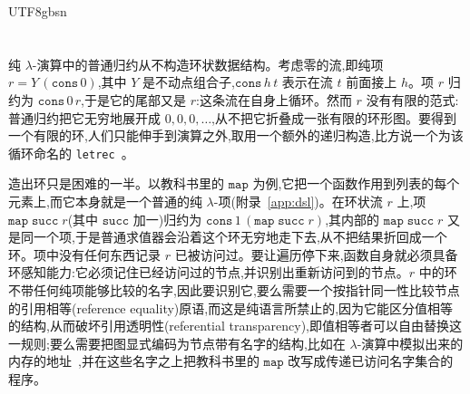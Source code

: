 \begin{CJK*}{UTF8}{gbsn}
  \keywords{\tablambdaKeywords{,}}
  \fi
  \fi %

  \ifTablambdaLNCS\else
  \maketitle
  \fi

  \ifTablambdaBody
  \section{}\label{sec:intro}

  \subsection{}

  \ifPaperChinese
  纯 $\lambda$-演算中的普通归约从不构造环状数据结构。考虑零的流,即纯项 $r = Y\,(\mathtt{cons}\,0)$,其中 $Y$ 是不动点组合子,$\mathtt{cons}\,h\,t$ 表示在流 $t$ 前面接上 $h$。项 $r$ 归约为 $\mathtt{cons}\,0\,r$,于是它的尾部又是 $r$:这条流在自身上循环。然而 $r$ 没有有限的范式:普通归约把它无穷地展开成 $0,0,0,\dots$,从不把它折叠成一张有限的环形图。要得到一个有限的环,人们只能伸手到演算之外,取用一个额外的递归构造,比方说一个为该循环命名的 \texttt{letrec}~\cite{ariola1997-explicit-recursion}。

  造出环只是困难的一半。以教科书里的 $\mathtt{map}$ 为例,它把一个函数作用到列表的每个元素上,而它本身就是一个普通的纯 $\lambda$-项(附录~\ref{app:dsl})。在环状流 $r$ 上,项 $\mathtt{map}\;\mathtt{succ}\;r$(其中 $\mathtt{succ}$ 加一)归约为 $\mathtt{cons}\,1\,(\mathtt{map}\;\mathtt{succ}\;r)$,其内部的 $\mathtt{map}\;\mathtt{succ}\;r$ 又是同一个项,于是普通求值器会沿着这个环无穷地走下去,从不把结果折回成一个环。项中没有任何东西记录 $r$ 已被访问过。要让遍历停下来,函数自身就必须具备环感知能力:它必须记住已经访问过的节点,并识别出重新访问到的节点。$r$ 中的环不带任何纯项能够比较的名字,因此要识别它,要么需要一个按指针同一性比较节点的引用相等(reference equality)原语,而这是纯语言所禁止的,因为它能区分值相等的结构,从而破坏引用透明性(referential transparency),即值相等者可以自由替换这一规则;要么需要把图显式编码为节点带有名字的结构,比如在 $\lambda$-演算中模拟出来的内存的地址~\cite{ikuta2022-lambda-8cc},并在这些名字之上把教科书里的 $\mathtt{map}$ 改写成传递已访问名字集合的程序。


\end{CJK*}
